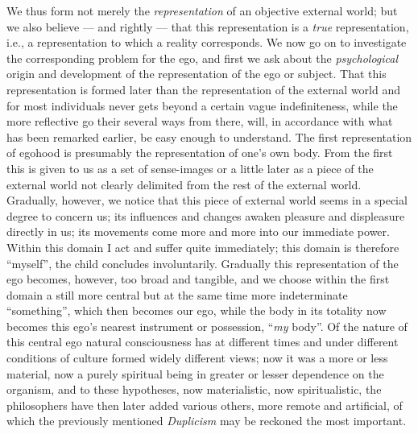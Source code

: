 \documentclass[12pt,a4paper,openany]{book}
\newcommand{\opage}[1]{\marginnote{\footnotesize\textit{[#1]}}}
\begin{document}
We thus form not merely the \emph{representation} of an objective external world; but we
also believe --- and rightly --- that this representation is a \emph{true} representation,
i.e., a representation to which a reality corresponds. We now go on to investigate the
corresponding problem for the ego, and first we ask about the \emph{psychological} origin
and development of the representation of the ego or subject. That this representation is
formed later than the representation of the external world and for most individuals never
gets beyond a certain vague indefiniteness, while the more reflective go their several
ways from there, will, in accordance with what has been remarked earlier, be easy enough
to understand. The first representation of egohood is presumably the representation of
one's own body. From the first this is given to us as a set of sense-images or a little
later as a piece of the external world not clearly delimited from the rest of the
external world. Gradually, however, we notice that this piece of external world seems in a
special degree to concern us; its influences and changes awaken pleasure and displeasure
directly in us; its movements come more and more into our immediate
\setcounter{footnote}{0}%
\opage{256}power. Within this domain I act and suffer quite immediately; this domain is therefore
``myself'', the child concludes involuntarily. Gradually this representation of the ego
becomes, however, too broad and tangible, and we choose within the first domain a still
more central but at the same time more indeterminate ``something'', which then becomes
our ego, while the body in its totality now becomes this ego's nearest instrument or
possession, ``\emph{my} body''. Of the nature of this central ego natural consciousness
has at different times and under different conditions of culture formed widely different
views; now it was a more or less material, now a purely spiritual being in greater or
lesser dependence on the organism, and to these hypotheses, now materialistic, now
spiritualistic, the philosophers have then later added various others, more remote and
artificial, of which the previously mentioned \emph{Duplicism}
may be reckoned the most important.
\end{document}

